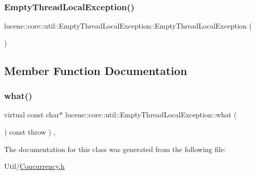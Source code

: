 \subsubsection{\texorpdfstring{Empty\+Thread\+Local\+Exception()}{EmptyThreadLocalException()}}
{\footnotesize\ttfamily lucene\+::core\+::util\+::\+Empty\+Thread\+Local\+Exception\+::\+Empty\+Thread\+Local\+Exception (\begin{DoxyParamCaption}{ }\end{DoxyParamCaption})\hspace{0.3cm}{\ttfamily [inline]}}



\subsection{Member Function Documentation}
\mbox{\label{classlucene_1_1core_1_1util_1_1EmptyThreadLocalException_a33f16d7924d5b7b094c1af85ff8268ef}} 
\subsubsection{\texorpdfstring{what()}{what()}}
{\footnotesize\ttfamily virtual const char$\ast$ lucene\+::core\+::util\+::\+Empty\+Thread\+Local\+Exception\+::what (\begin{DoxyParamCaption}{ }\end{DoxyParamCaption}) const throw  ) \hspace{0.3cm}{\ttfamily [inline]}, {\ttfamily [virtual]}}



The documentation for this class was generated from the following file\+:\begin{DoxyCompactItemize}
\item 
Util/\mbox{\hyperlink{Concurrency_8h}{Concurrency.\+h}}\end{DoxyCompactItemize}
